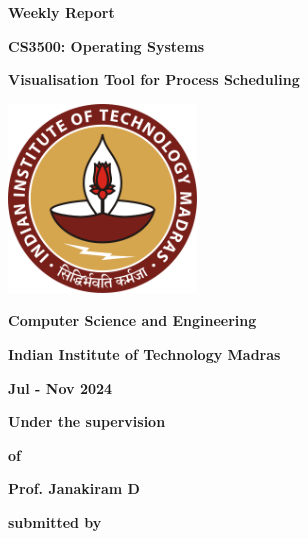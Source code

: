 \documentclass[12pt]{article}
\begin{document}
\begin{center}
    \Large \bfseries{Weekly Report}
\end{center}

\begin{center}
    \Large \bfseries{CS3500: Operating Systems}
\end{center}


\begin{center}
    \Large \bfseries{Visualisation Tool for Process Scheduling}
\end{center}
\begin{center}
    \vspace{1.2cm}
    \includegraphics[width=5cm]{logos and images/IIT_Madras_Logo.svg.png}

    \textbf{Computer Science and Engineering}
    \vspace{0.3cm}

    \textbf{Indian Institute of Technology  Madras}
    \vspace{0.3cm}

    \textbf{Jul - Nov 2024}
    \vspace{1.2cm}

    \noindent \textbf{Under the supervision}
    \vspace{0.2cm}

    \noindent \textbf{of}
    \vspace{0.2cm}

    \noindent\textbf{Prof. Janakiram D}
     \vspace{0.2cm}

    \noindent \textbf{submitted by}
    \vspace{0.3cm}


\end{center}
\end{document}
